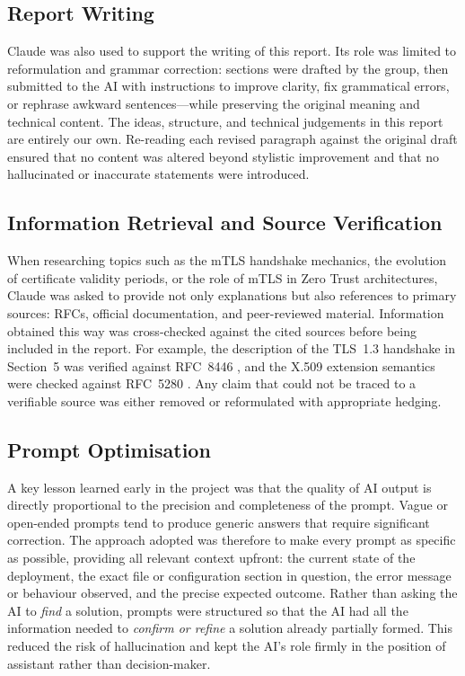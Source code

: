 \documentclass[10pt,twocolumn]{article}
\begin{document}
\subsection{Report Writing}

Claude was also used to support the writing of this report. Its role was
limited to reformulation and grammar correction: sections were drafted by
the group, then submitted to the AI with instructions to improve clarity,
fix grammatical errors, or rephrase awkward sentences---while preserving
the original meaning and technical content. The ideas, structure, and
technical judgements in this report are entirely our own. Re-reading each
revised paragraph against the original draft ensured that no content was
altered beyond stylistic improvement and that no hallucinated or inaccurate
statements were introduced.

\subsection{Information Retrieval and Source Verification}

When researching topics such as the mTLS handshake mechanics, the evolution
of certificate validity periods, or the role of mTLS in Zero Trust
architectures, Claude was asked to provide not only explanations but also
references to primary sources: RFCs, official documentation, and peer-reviewed
material. Information obtained this way was cross-checked against the cited
sources before being included in the report. For example, the description
of the TLS~1.3 handshake in Section~5 was verified against RFC~8446
\cite{rfc8446}, and the X.509 extension semantics were checked against
RFC~5280 \cite{rfc5280}. Any claim that could not be traced to a verifiable
source was either removed or reformulated with appropriate hedging.

\subsection{Prompt Optimisation}

A key lesson learned early in the project was that the quality of AI output
is directly proportional to the precision and completeness of the prompt.
Vague or open-ended prompts tend to produce generic answers that require
significant correction. The approach adopted was therefore to make every
prompt as specific as possible, providing all relevant context upfront:
the current state of the deployment, the exact file or configuration
section in question, the error message or behaviour observed, and the
precise expected outcome. Rather than asking the AI to \emph{find} a
solution, prompts were structured so that the AI had all the information
needed to \emph{confirm or refine} a solution already partially formed.
This reduced the risk of hallucination and kept the AI's role firmly in the
position of assistant rather than decision-maker.
\end{document}
